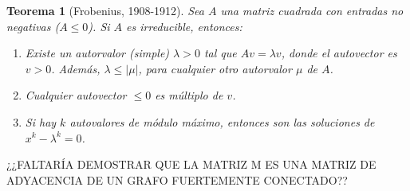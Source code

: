 \documentclass[size=a4, parskip=half, titlepage=false, toc=flat, toc=bib, 12pt]{scrartcl}
\theoremstyle{theorem-style}
\newtheorem{nth}{Teorema}[section]
\theoremstyle{definition-style}
\theoremstyle{remark-style}
\theoremstyle{example-style}
\theoremstyle{definition-style}
\theoremstyle{remark-style}
\begin{document}
\begin{nth}[Frobenius, 1908-1912]
Sea $A $ una matriz cuadrada con entradas no negativas ($A \leq 0$). Si $A$ es irreducible, entonces:
\begin{enumerate}
\item Existe un autorvalor (simple) $\lambda > 0$ tal que $A v = \lambda v$, donde el autovector es
$v > 0$. Además, $\lambda \leq |\mu|$, para cualquier otro autorvalor $\mu$ de $A$.
\item Cualquier autovector $\leq 0$ es múltiplo de $v$.
\item Si hay $k$ autovalores de módulo máximo, entonces son las soluciones de $x^k - \lambda^k = 0$.
\end{enumerate}
\end{nth}

¿¿FALTARÍA DEMOSTRAR QUE LA MATRIZ M ES UNA MATRIZ DE ADYACENCIA DE UN GRAFO FUERTEMENTE CONECTADO??
\end{document}

